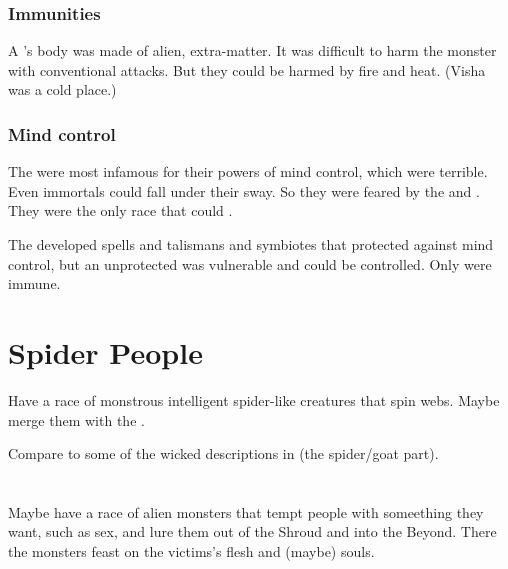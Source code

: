 \subsubsection{Immunities}
A \shugul's body was made of alien, extra-\Miithian matter. 
It was difficult to harm the monster with conventional attacks. 
But they could be harmed by fire and heat. 
(Visha was a cold place.)





\subsubsection{Mind control}
The \shugul were most infamous for their powers of mind control, which were terrible.
Even immortals could fall under their sway. 
So they were feared by the \ophidians and \resphain.
They were the only race that could .

The \ophidians developed spells and talismans and symbiotes that protected against \shugul mind control, but an unprotected \ophidian was vulnerable and could be controlled.
Only \dragons were immune. 
















\section{Spider People}
Have a race of monstrous intelligent spider-like creatures that spin webs. 
Maybe merge them with the . 

Compare to some of the wicked descriptions in \cite{Cracked:GeneticExperiments} (the spider/goat part). 
















\section{\Succubus}
\index{\succubus}
Maybe have a race of alien monsters that tempt people with someething they want, such as sex, and lure them out of the Shroud and into the Beyond. 
There the monsters feast on the victims's flesh and (maybe) souls. 


